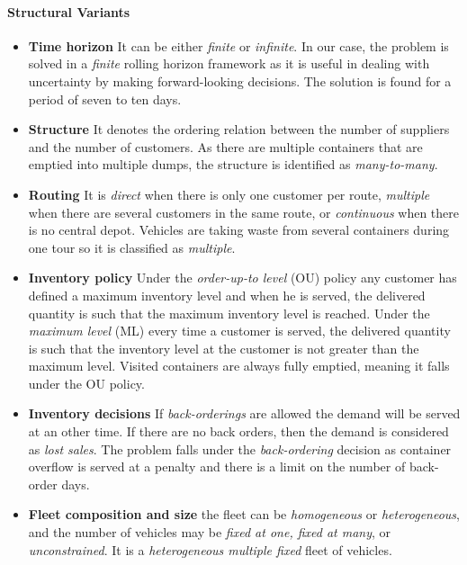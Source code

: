 \documentclass[12pt,a4paper]{article}
\begin{document}
\paragraph{Structural Variants}
\begin{itemize}
\item \textbf{Time horizon} It can be either \textit{finite} or \textit{infinite}. In our case, the problem is solved in a \textit{finite} rolling horizon framework as it is useful in dealing with uncertainty by making forward-looking decisions. The solution is found for a period of seven to ten days.
\item \textbf{Structure} It denotes the ordering relation between the number of suppliers and the number of customers. As there are multiple containers that are emptied into multiple dumps, the structure is identified as \textit{many-to-many}.
\item \textbf{Routing} It is \textit{direct} when there is only one customer per route, \textit{multiple} when there are several customers in the same route, or \textit{continuous} when there is no central depot. Vehicles are taking waste from several containers during one tour so it is classified as \textit{multiple}.
\item \textbf{Inventory policy} Under the \textit{order-up-to level} (OU) policy any customer has defined a maximum inventory level and when he is served, the delivered quantity is such that the maximum inventory level is reached. Under the \textit{maximum level} (ML) every time a customer is served, the delivered quantity is such that the inventory level at the customer is not greater than the maximum level. Visited containers are always fully emptied, meaning it falls under the OU policy.
\item \textbf{Inventory decisions} If \textit{back-orderings} are allowed the demand will be served at an other time. If there are no back orders, then the demand is considered as \textit{lost sales}. The problem falls under the \textit{back-ordering} decision as container overflow is served at a penalty and there is a limit on the number of back-order days.
\item \textbf{Fleet composition and size} the fleet can be \textit{homogeneous} or \textit{heterogeneous}, and the number of vehicles may be \textit{fixed at one, fixed at many}, or \textit{unconstrained}. It is a \textit{heterogeneous multiple fixed} fleet of vehicles.
\end{itemize} 
\end{document}
